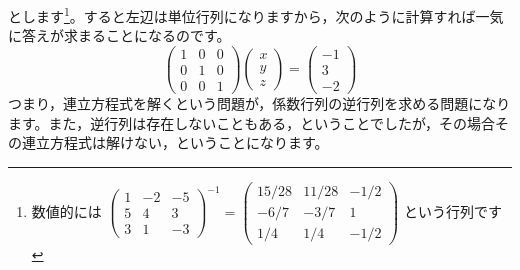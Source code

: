\documentclass{ltjsbook}
\begin{document}
とします\footnote{数値的には
$\begin{pmatrix} 1 & -2 & -5 \\
                5 & 4  & 3  \\
                3 & 1  & -3\end{pmatrix}^{-1}
    =
    \begin{pmatrix} 15/28 & 11/28 & -1/2 \\
                -6/7  & -3/7  & 1    \\
                1/4   & 1/4   & -1/2\end{pmatrix}
$
という行列です}。すると左辺は単位行列になりますから，次のように計算すれば一気に答えが求まることになるのです。
\[
    \begin{pmatrix} 1 & 0 & 0 \\
                0 & 1 & 0 \\
                0 & 0 & 1\end{pmatrix}
    \begin{pmatrix} x \\ y \\ z \end{pmatrix}
    =
    \begin{pmatrix} -1 \\ 3 \\ -2 \end{pmatrix}
\]
つまり，連立方程式を解くという問題が，係数行列の逆行列を求める問題になります。また，逆行列は存在しないこともある，ということでしたが，その場合その連立方程式は解けない，ということになります。
\end{document}

